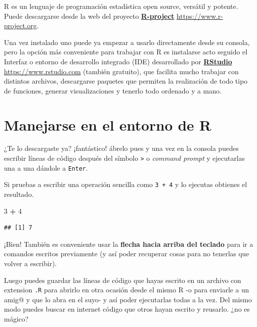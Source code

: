 \documentclass[]{book}
\newenvironment{Shaded}{\begin{snugshade}}{\end{snugshade}}
\newcommand{\DecValTok}[1]{\textcolor[rgb]{0.00,0.00,0.81}{#1}}
\newcommand{\OperatorTok}[1]{\textcolor[rgb]{0.81,0.36,0.00}{\textbf{#1}}}
\newcommand{\StringTok}[1]{\textcolor[rgb]{0.31,0.60,0.02}{#1}}
\theoremstyle{definition}
\theoremstyle{definition}
\theoremstyle{definition}
\theoremstyle{remark}
\begin{document}
R \citep{R-r} es un lenguaje de programación estadística open source,
versátil y potente. Puede descargarse desde la web del proyecto
\href{https://www.r-project.org}{\textbf{R-project}}
\url{https://www.r-project.org}.

Una vez instalado uno puede ya empezar a usarlo directamente desde su
consola, pero la opción más conveniente para trabajar con R es
instalarse acto seguido el Interfaz o entorno de desarrollo integrado
(IDE) desarrollado por \href{https://www.rstudio.com}{\textbf{RStudio}}
\url{https://www.rstudio.com} (también gratuito), que facilita mucho
trabajar con distintos archivos, descargarse paquetes que permiten la
realización de todo tipo de funciones, generar visualizaciones y tenerlo
todo ordenado y a mano.

\hypertarget{manejarse-en-el-entorno-de-r}{%
\section{Manejarse en el entorno de
R}\label{manejarse-en-el-entorno-de-r}}

¿Te lo descargaste ya? ¡fantástico! ábrelo pues y una vez en la consola
puedes escribir líneas de código después del símbolo
\texttt{\textgreater{}} o \emph{command prompt} y ejecutarlas una a una
dándole a \texttt{Enter}.

Si pruebas a escribir una operación sencilla como \texttt{3\ +\ 4} y lo
ejecutas obtienes el resultado.

\begin{Shaded}
\begin{Highlighting}[]
\DecValTok{3} \OperatorTok{+}\StringTok{ }\DecValTok{4}
\end{Highlighting}
\end{Shaded}

\begin{verbatim}
## [1] 7
\end{verbatim}

¡Bien! También es conveniente usar la \textbf{flecha hacia arriba del
teclado} para ir a comandos escritos previamente (y así poder recuperar
cosas para no tenerlas que volver a escribir).

Luego puedes guardar las líneas de código que hayas escrito en un
archivo con extension \texttt{.R} para abrirlo en otra ocasión desde el
mismo R -o para enviarle a un amig@ y que lo abra en el suyo- y así
poder ejecutarlas todas a la vez. Del mismo modo puedes buscar en
internet código que otros hayan escrito y reusarlo. ¿no es mágico?
\end{document}
